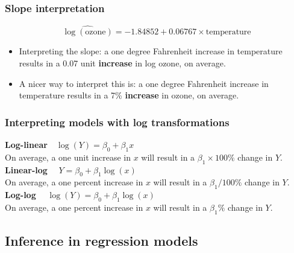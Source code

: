 \documentclass[a4paper]{article}
\begin{document}
\subsubsection{Slope interpretation}
\[
	\widehat{\log(\text{ozone})} = -1.84852 + 0.06767\times\text{temperature}
\]
\begin{itemize}
	\item Interpreting the slope: a one degree Fahrenheit increase in temperature results in a 0.07 unit \textbf{increase} in log ozone, on average.
	\item A nicer way to interpret this is: a one degree Fahrenheit increase in temperature results in a 7\% \textbf{increase} in ozone, on average.
\end{itemize}
\subsubsection{Interpreting models with log transformations}
\textbf{Log-linear}\( \quad \log(Y) = \beta_0 + \beta_1 x \)\\
On average, a one unit increase in \( x \) will result in a \( \beta_1 \times 100\% \) change in \( Y \).\\
\textbf{Linear-log} \( \quad Y = \beta_0 + \beta_1 \log(x) \)\\
On average, a one percent increase in \( x \) will result in a \( \beta_1 / 100\% \) change in \( Y \).\\
\textbf{Log-log} \( \quad \log(Y) = \beta_0 + \beta_1 \log(x) \)\\
On average, a one percent increase in \( x \) will result in a \( \beta_1 \% \) change in \( Y \).
\subsection{Inference in regression models}
\end{document}
